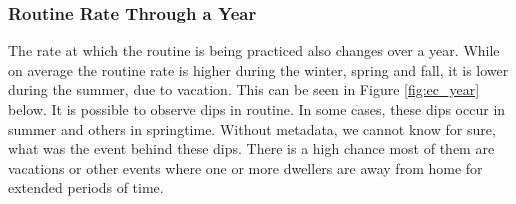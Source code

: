 \subsubsection{Routine Rate Through a Year}

The rate at which the routine is being practiced also changes over a year. 
While on average the routine rate is higher during the winter, spring and fall, it is lower during the summer, due to vacation. 
This can be seen in Figure \ref{fig:ec_year} below. 
It is possible to observe dips in routine. 
In some cases, these dips occur in summer and others in springtime. 
Without metadata, we cannot know for sure, what was the event behind these dips. 
There is a high chance most of them are vacations or other events where one or more dwellers are away from home for extended periods of time. 

